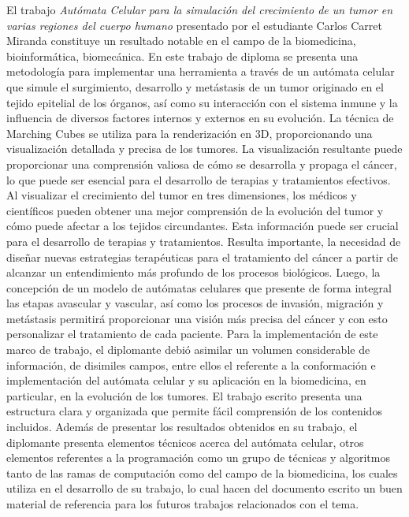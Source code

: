 \begin{opinion}
    El trabajo \textit{Autómata Celular para la simulación del crecimiento de un tumor en varias regiones del cuerpo humano} presentado por el estudiante Carlos Carret Miranda constituye un resultado notable en el campo de la biomedicina, bioinformática, biomecánica. En este trabajo de diploma se presenta una metodología para implementar una herramienta a través de un autómata celular que simule el surgimiento, desarrollo y metástasis de un tumor originado en el tejido epitelial de los órganos, así como su interacción con el sistema inmune y la influencia de diversos factores internos y externos en su evolución. La técnica de Marching Cubes se utiliza para la renderización en 3D, proporcionando una visualización detallada y precisa de los tumores. La visualización resultante puede proporcionar una comprensión valiosa de cómo se desarrolla y propaga el cáncer, lo que puede ser esencial para el desarrollo de terapias y tratamientos efectivos. Al visualizar el crecimiento del tumor en tres dimensiones, los médicos y científicos pueden obtener una mejor comprensión de la evolución del tumor y cómo puede afectar a los tejidos circundantes. Esta información puede ser crucial para el desarrollo de terapias y tratamientos. Resulta importante, la necesidad de diseñar nuevas estrategias terapéuticas para el tratamiento del cáncer a partir de alcanzar un entendimiento más profundo de los procesos biológicos. Luego, la concepción de un modelo de autómatas celulares que presente de forma integral las etapas avascular y vascular, así como los procesos de invasión, migración y metástasis permitirá proporcionar una visión más precisa del cáncer y con esto personalizar el tratamiento de cada paciente.
Para la implementación de este marco de trabajo, el diplomante debió asimilar un volumen considerable de información, de disimiles campos, entre ellos el referente a la conformación e implementación del autómata celular y su aplicación en la biomedicina, en particular, en la evolución de los tumores. 
El trabajo escrito presenta una estructura clara y organizada que permite fácil comprensión de los contenidos incluidos. Además de presentar los resultados obtenidos en su trabajo, el diplomante presenta elementos técnicos acerca del autómata celular, otros elementos referentes a la programación como un grupo de técnicas y algoritmos tanto de las ramas de computación como del campo de la biomedicina, los cuales utiliza en el desarrollo de su trabajo, lo cual hacen del documento escrito un buen material de referencia para los futuros trabajos relacionados con el tema.

\end{opinion}
